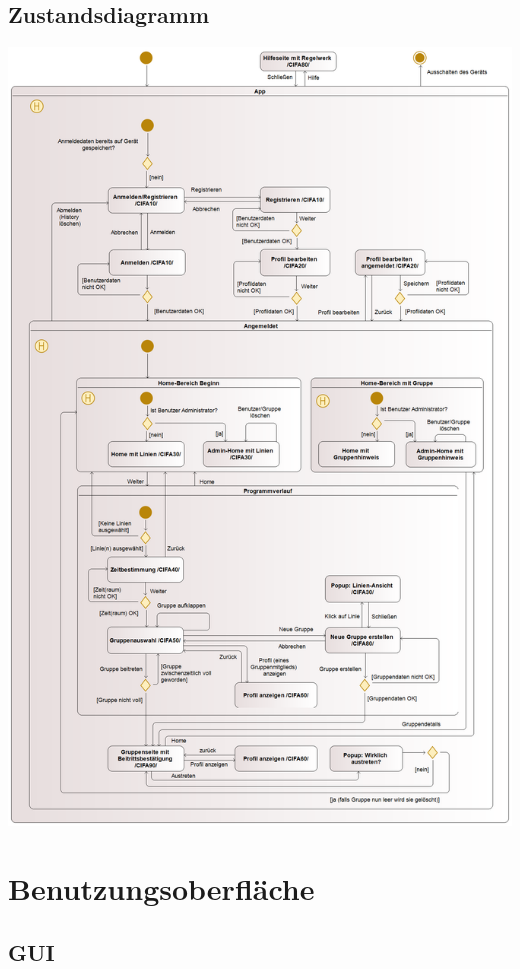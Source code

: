 \documentclass[a4paper]{scrreprt}
\begin{document}
\section{Zustandsdiagramm}	
\begin{center}
	\includegraphics[scale=0.23]{res/Zustandsdiagramm.png}
\end{center}

\chapter{Benutzungsoberfläche}
\section{GUI}
\end{document}
